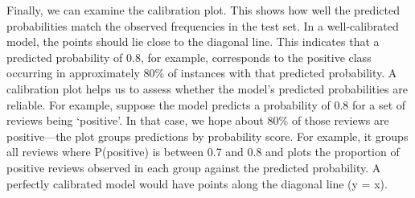 \documentclass[
]{book}
\begin{document}
Finally, we can examine the calibration plot. This shows how well the predicted probabilities match the observed frequencies in the test set. In a well-calibrated model, the points should lie close to the diagonal line. This indicates that a predicted probability of 0.8, for example, corresponds to the positive class occurring in approximately 80\% of instances with that predicted probability. A calibration plot helps us to assess whether the model's predicted probabilities are reliable. For example, suppose the model predicts a probability of 0.8 for a set of reviews being `positive'. In that case, we hope about 80\% of those reviews are positive---the plot groups predictions by probability score. For example, it groups all reviews where P(positive) is between 0.7 and 0.8 and plots the proportion of positive reviews observed in each group against the predicted probability. A perfectly calibrated model would have points along the diagonal line (y = x).
\end{document}
